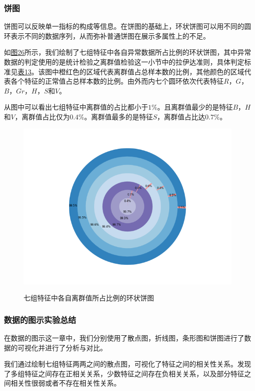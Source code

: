 \documentclass[UTF8]{ctexart}
\begin{document}
	\subsubsection{饼图}
	饼图可以反映单一指标的构成等信息。在饼图的基础上，环状饼图可以用不同的圆环表示不同的数据序列，从而弥补普通饼图在展示多属性上的不足。
	
	如\hyperref[Fig.26]{图26}所示，我们绘制了七组特征中各自异常数据所占比例的环状饼图，其中异常数据的判定使用的是统计检验之离群值检验这一小节中的拉伊达准则，具体判定标准见\hyperref[Chart.13]{表13}。该图中橙红色的区域代表离群值占总样本数的比例，其他颜色的区域代表各个特征的正常值占总样本数的比例。由外而内七个圆环依次代表特征$R$，$G$，$B$，$Gr$，$H$，$S$和$V$。
	
	从图中可以看出七组特征中离群值的占比都小于$1\%$。且离群值最少的是特征$B$，$H$和$V$，离群值占比仅为$0.4\%$。离群值最多的是特征$S$，离群值占比达$0.7\%$。
	
	\begin{figure}[htbp]
		\centering
		\caption{七组特征中各自离群值所占比例的环状饼图}
		\includegraphics[width=1.0\textwidth]{pie.png}
		\label{Fig.26}
	\end{figure}
	
	\subsubsection{数据的图示实验总结}
	在数据的图示这一章中，我们分别使用了散点图，折线图，条形图和饼图进行了数据的可视化并进行了分析与对比。
	
	我们通过绘制七组特征两两之间的散点图，可视化了特征之间的相关性关系。发现了多组特征之间存在正相关关系，少数特征之间存在负相关关系，以及部分特征之间相关性很弱或者不存在相关性关系。
	
\end{document}

